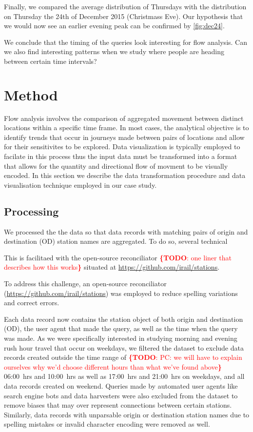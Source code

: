 \documentclass{sig-alternate}
\newcommand{\todo}[1]{\noindent\textcolor{red}{{\bf \{TODO}: #1{\bf \}}}}
\begin{document}
Finally, we compared the average distribution of Thursdays with the distribution on Thursday the 24th of December 2015 (Christmass Eve).
Our hypothesis that we would now see an earlier evening peak can be confirmed by \cref{fig:dec24}.

We conclude that the timing of the queries look interesting for flow analysis. 
Can we also find interesting patterns when we study where people are heading between certain time intervals?

\section{Method}
\label{sec:method}

Flow analysis involves the comparison of aggregated movement between distinct locations within a specific time frame. 
In most cases, the analytical objective is to identify trends that occur in journeys made  between pairs of locations and allow for their sensitivites to be explored. 
Data visualization is typically employed to facilate in this process thus the input data must be transformed into a format that allows for the quantity and directional flow of movment to be visually encoded. In this section we describe the data transformation procedure and data visualisation technique employed in our case study.

\subsection{Processing}

We processed the the data so that data records with matching pairs of origin and destination (OD) station names are aggregated. To do so, several technical 

 This is facilitaed with the open-source reconciliator \todo{one liner that describes how this works} situated at \url{https://github.com/irail/stations}.

To address this challenge, an open-source reconciliator (\url{https://github.com/irail/stations}) was employed to reduce spelling variations and correct errors.

Each data record now contains the station object of both origin and destination (OD), the user agent that made the query, as well as the time when the query was made.
As we were specifically interested in studying morning and evening rush hour travel that occur on weekdays, we filtered the dataset to exclude data records created outside the time range of \todo{PC: we will have to explain ourselves why we'd choose different hours than what we've found above} 06:00~hrs and 10:00~hrs as well as 17:00~hrs and 21:00~hrs on weekdays, and all data records created on weekend. Queries made by automated user agents like search engine bots and data harvesters were also excluded from the dataset to remove biases that may over represent connections between certain stations. Similarly, data records with unparsable origin or destination station names due to spelling mistakes or invalid character encoding were removed as well.
\end{document}
